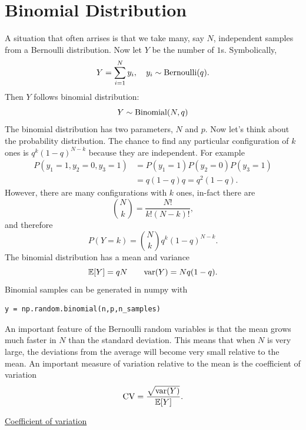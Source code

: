   \section{Binomial Distribution}
A situation that often arrises is that we take many, say $N$, independent samples from a Bernoulli distribution. Now let $Y$ be the number of $1$s. Symbolically, 
\begin{equation}
Y = \sum_{i=1}^N y_i ,\quad y_i \sim {\rm Bernoulli}(q).
\end{equation}
 Then $Y$ follows {\dfn binomial distribution}:
\begin{equation}
Y \sim {\rm Binomial}(N,q)
\end{equation}
The binomial distribution has two parameters, $N$ and $p$. Now let's think about the probability distribution. The chance to find any particular configuration of $k$ ones is $q^k(1-q)^{N-k}$ because they are independent. For example
\begin{align}
P(y_1 = 1,y_2 = 0,y_3 = 1) &= P(y_1 = 1)P(y_2=0)P(y_3 =1) \\
&= q(1-q)q = q^2(1-q).
\end{align}
However, there are many configurations with $k$ ones, in-fact there are 
\begin{equation}
{N \choose k} = \frac{N!}{k!(N-k)!},
\end{equation}
and therefore 
\begin{equation}
P(Y=k) = {N \choose k}q^{k}(1-q)^{N-k}. 
\end{equation}
The binomial distribution has a mean and variance
\begin{equation}
\mathbb E[Y] = qN \quad\quad{\rm var}(Y) = Nq(1-q). 
\end{equation}
Binomial samples can be generated in numpy with
 \begin{Verbatim}
y = np.random.binomial(n,p,n_samples)
 \end{Verbatim}
 
 An important feature of the Bernoulli random variables is that the mean grows much faster in $N$ than the standard deviation. This means that when $N$ is very large, the deviations from the average will become very small relative to the mean. An important measure of variation relative to the mean is the coefficient of variation 
\begin{equation}
{\rm CV} = \frac{\sqrt{{\rm var}(Y)}}{\mathbb E[Y]}. 
\end{equation}
 
 
  \begin{example}
\href{https://colab.research.google.com/drive/1PPFwE4GUzsr707s3mPhGRs7-TYlHxND2#scrollTo=oaFLfi0JI4in&line=1&uniqifier=1}{Coefficient of variation}
\end{example}



